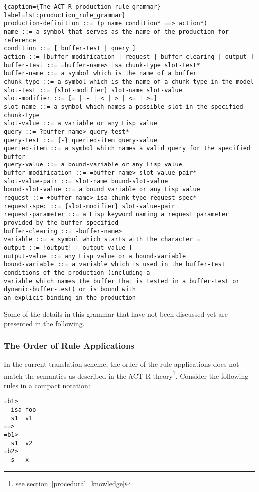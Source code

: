 \begin{lstlisting}{caption={The ACT-R production rule grammar} label=lst:production_rule_grammar}
production-definition ::= (p name condition* ==> action*)
name ::= a symbol that serves as the name of the production for reference
condition ::= [ buffer-test | query ]
action ::= [buffer-modification | request | buffer-clearing | output ]
buffer-test ::= =buffer-name> isa chunk-type slot-test*
buffer-name ::= a symbol which is the name of a buffer
chunk-type ::= a symbol which is the name of a chunk-type in the model
slot-test ::= {slot-modifier} slot-name slot-value
slot-modifier ::= [= | - | < | > | <= | >=]
slot-name ::= a symbol which names a possible slot in the specified chunk-type
slot-value ::= a variable or any Lisp value
query ::= ?buffer-name> query-test*
query-test ::= {-} queried-item query-value
queried-item ::= a symbol which names a valid query for the specified buffer
query-value ::= a bound-variable or any Lisp value
buffer-modification ::= =buffer-name> slot-value-pair*
slot-value-pair ::= slot-name bound-slot-value
bound-slot-value ::= a bound variable or any Lisp value
request ::= +buffer-name> isa chunk-type request-spec*
request-spec ::= {slot-modifier} slot-value-pair
request-parameter ::= a Lisp keyword naming a request parameter provided by the buffer specified
buffer-clearing ::= -buffer-name>
variable ::= a symbol which starts with the character =
output ::= !output! [ output-value ]
output-value ::= any Lisp value or a bound-variable
bound-variable ::= a variable which is used in the buffer-test conditions of the production (including a
variable which names the buffer that is tested in a buffer-test or dynamic-buffer-test) or is bound with
an explicit binding in the production
\end{lstlisting}

Some of the details in this grammar that have not been discussed yet are presented in the following.

\subsubsection{The Order of Rule Applications}

In the current translation scheme, the order of the rule applications does not match the semantics as described in the ACT-R theory\footnote{see section~\ref{procedural_knowledge}}. Consider the following rules in a compact notation:

\begin{lstlisting}
=b1>
  isa foo
  s1  v1
==>
=b1>
  s1  v2
=b2>
  s   x
\end{lstlisting}

